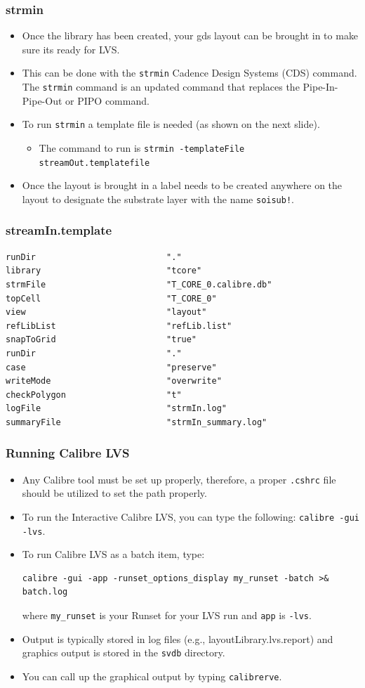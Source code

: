 \documentclass{beamer}
\begin{document}
\begin{frame}[fragile]
\frametitle{strmin}
\begin{itemize}
\item Once the library has been created, your gds layout can be
  brought in to make sure its ready for LVS.
\item This can be done with the \verb+strmin+ Cadence Design Systems (CDS)
  command.  The \verb+strmin+ command is an updated command that
  replaces the Pipe-In-Pipe-Out or PIPO command.
\item To run \verb+strmin+ a template file is needed (as shown on the
  next slide).
  \begin{itemize}
  \item The command to run is \verb+strmin -templateFile streamOut.templatefile+
  \end{itemize}
\item Once the layout is brought in a label needs to be created
  anywhere on the layout to designate the substrate layer with the
  name \verb+soisub!+.
\end{itemize}
\end{frame}
\begin{frame}[fragile]
\frametitle{streamIn.template}
\footnotesize
\begin{verbatim}
runDir                          "."
library                         "tcore"
strmFile                        "T_CORE_0.calibre.db"
topCell                         "T_CORE_0" 
view                            "layout"
refLibList                      "refLib.list"
snapToGrid                      "true"
runDir                          "."
case                            "preserve"
writeMode                       "overwrite"
checkPolygon                    "t"
logFile                         "strmIn.log"
summaryFile                     "strmIn_summary.log"
\end{verbatim}
\normalsize
\end{frame}
\begin{frame}[fragile]
\frametitle{Running Calibre LVS}
\begin{itemize}
\item Any Calibre tool must be set up properly, therefore, a proper
  \verb+.cshrc+ file should be utilized to set the path properly.
\item To run the Interactive Calibre LVS, you can type the following:
  \verb+calibre -gui -lvs+.
\item To run Calibre LVS as a batch item, type: 
\tiny
\begin{verbatim}
calibre -gui -app -runset_options_display my_runset -batch >& batch.log
\end{verbatim}
\normalsize
where \verb+my_runset+ is your Runset for your LVS run and \verb+app+
is \verb+-lvs+.
\item Output is typically stored in log files (e.g.,
  layoutLibrary.lvs.report) and graphics output is stored in the
  \verb+svdb+ directory.
\item You can call up the graphical output by typing \verb+calibrerve+.
\end{itemize}
\end{frame}
\end{document}

